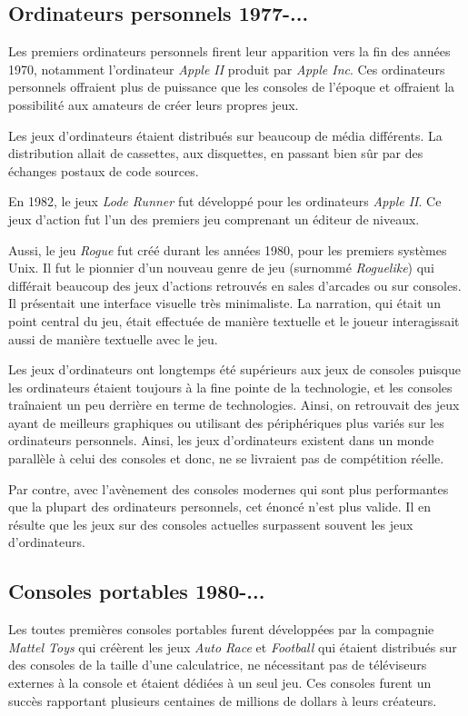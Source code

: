 \documentclass[12pt,oneside,letterpaper,francais]{book}
\newcommand{\lr}{{\textit{Lode Runner }}}
\begin{document}
\subsection{Ordinateurs personnels 1977-...}
Les premiers ordinateurs personnels firent leur apparition vers la
fin des années 1970, notamment l'ordinateur \textit{Apple II}
produit par \textit{Apple Inc}. Ces ordinateurs personnels offraient
plus de puissance que les consoles de l'époque et offraient la
possibilité aux amateurs de créer leurs propres jeux.

Les jeux d'ordinateurs étaient distribués sur beaucoup de média
différents. La distribution allait de cassettes, aux disquettes, en
passant bien sûr par des échanges postaux de code sources.

En 1982, le jeux \lr fut développé pour les
ordinateurs \textit{Apple II}. Ce jeux d'action fut l'un des premiers
jeu comprenant un éditeur de niveaux.

Aussi, le jeu \textit{Rogue} fut créé durant les années 1980, pour les
premiers systèmes Unix. Il fut le pionnier d'un nouveau genre de jeu
(surnommé \textit{Roguelike}) qui différait beaucoup des jeux
d'actions retrouvés en sales d'arcades ou sur consoles. Il présentait
une interface visuelle très minimaliste. La narration, qui était un
point central du jeu, était effectuée de manière textuelle et le
joueur interagissait aussi de manière textuelle avec le jeu.

Les jeux d'ordinateurs ont longtemps été supérieurs aux jeux de
consoles puisque les ordinateurs étaient toujours à la fine pointe de
la technologie, et les consoles traînaient un peu derrière en terme de
technologies. Ainsi, on retrouvait des jeux ayant de meilleurs
graphiques ou utilisant des périphériques plus variés sur les
ordinateurs personnels. Ainsi, les jeux d'ordinateurs existent dans un
monde parallèle à celui des consoles et donc, ne se livraient pas de
compétition réelle.

Par contre, avec l'avènement des consoles modernes qui sont plus
performantes que la plupart des ordinateurs personnels, cet énoncé
n'est plus valide. Il en résulte que les jeux sur des consoles
actuelles surpassent souvent les jeux d'ordinateurs.


\subsection{Consoles portables 1980-...}
Les toutes premières consoles portables furent développées par la
compagnie \textit{Mattel Toys} qui créèrent les jeux \textit{Auto
  Race} et \textit{Football} qui étaient distribués sur des consoles
de la taille d'une calculatrice, ne nécessitant pas de téléviseurs
externes à la console et étaient dédiées à un seul jeu. Ces consoles
furent un succès rapportant plusieurs centaines de millions de dollars
à leurs créateurs.
\end{document}
